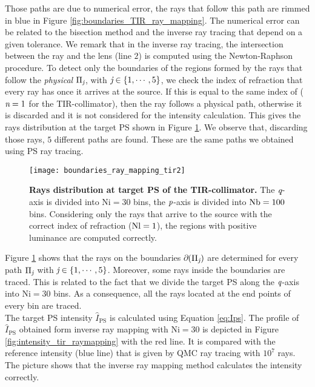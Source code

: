Those paths are due to numerical error, the rays that follow this path are rimmed in blue in Figure \ref{fig:boundaries_TIR_ray_mapping}. The numerical error can be related to the bisection method and the inverse ray tracing that depend on a given tolerance. We remark that in the inverse ray tracing, the intersection between the ray and the lens (line $2$) is computed using the Newton-Raphson procedure.
To detect only the boundaries of the regions formed by the rays that follow the \textit{physical} $\Pi_{\textit{j}}$, with $\textit{j}\in\{1, \cdots, 5\}$, we check the index of refraction that every ray has once it arrives at the source.
If this is equal to the same index of  ($\textit{n}=1$ for the TIR-collimator), then the ray follows a physical path, otherwise it is discarded and it is not considered for the intensity calculation. This gives the rays distribution at the target PS shown in Figure \ref{fig:boundaries_TIR_ray_mapping1}. We observe that, discarding those rays, $5$ different paths are found. These are the same paths we obtained using PS ray tracing.
\begin{figure}[h]
  \begin{center}
  \texttt{[image: boundaries\_ray\_mapping\_tir2]}
  \end{center}
  \caption{\textbf{Rays distribution at target PS of the TIR-collimator.}
 The $\textit{q}$-axis is divided into $\textrm{Ni}=30$ bins, the $\textit{p}$-axis is divided into $\textrm{Nb} = 100$ bins. Considering only the rays that arrive to the source with the correct index of refraction ($\textrm{Nl}=1$), the regions with positive luminance are computed correctly.}
\label{fig:boundaries_TIR_ray_mapping1}
 \end{figure}
Figure \ref{fig:boundaries_TIR_ray_mapping1} shows that the rays on the boundaries $\partial$$(\Pi_{\textit{j}})$ are determined for every path $\Pi_{\textit{j}}$ with $\textit{j}\in\{1, \cdots, 5\}$. Moreover, some rays inside the boundaries are traced. This is related to the fact that we divide the target PS along the $\textit{q}$-axis into $\textrm{Ni}=30$ bins. As a consequence, all the rays located at the end points of every bin are traced. \\
\indent The target PS intensity $\hat{I}_{\textrm{PS}}$ is calculated using Equation \ref{eq:Ips}. The profile of $\hat{I}_{\textrm{PS}}$ obtained form inverse ray mapping with $\textrm{Ni}=30$ is depicted in Figure \ref{fig:intensity_tir_raymapping} with the red line. It is compared with the reference intensity (blue line) that is given by QMC ray tracing with $10^7$ rays. The picture shows that the inverse ray mapping method calculates the intensity correctly.
